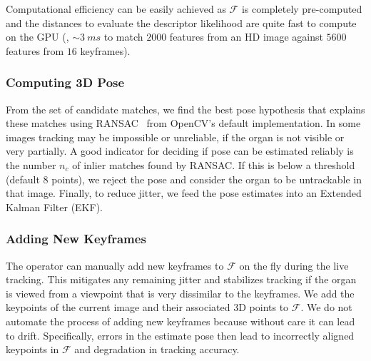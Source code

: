 Computational efficiency can be easily achieved as $\mathcal{F}$ is completely pre-computed and the distances to evaluate the descriptor likelihood are quite fast to compute on the GPU (\eg, $\sim\SI{3}{ms}$ to match $2000$ features from an HD image against $5600$ features from $16$ keyframes).

\subsubsection{Computing 3D Pose}
From the set of candidate matches, we find the best pose hypothesis that explains these  matches using   RANSAC~\cite{Fischler:1981:RSC:358669.358692} from OpenCV's default implementation.
In some images tracking may be impossible or unreliable, if the organ is not visible or very partially. A good indicator for deciding if pose can be estimated reliably is the number $n_c$ of inlier matches found by RANSAC. If this is below a threshold (default $8$ points), we reject the pose and consider the organ to be untrackable in that image. Finally, to reduce jitter, we feed the pose estimates into an Extended Kalman Filter (EKF). 

\subsubsection{Adding New Keyframes}
The operator can manually add new keyframes to $\mathcal{F}$ on the fly during the live tracking.
This mitigates any remaining jitter and stabilizes tracking if the organ is viewed from a viewpoint that is very dissimilar to the keyframes.
We add the keypoints of the current image and their associated 3D points to $\mathcal{F}$.
We do not automate the process of adding new keyframes because without care it can lead to drift.
Specifically, errors in the estimate pose then lead to incorrectly aligned keypoints in $\mathcal{F}$ and degradation in tracking accuracy.

